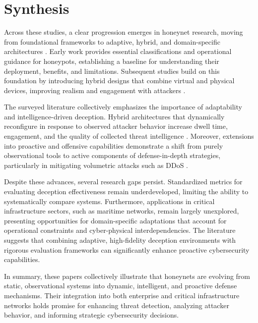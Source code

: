 \documentclass[12pt]{article}
\begin{document}
\section{Synthesis}
Across these studies, a clear progression emerges in honeynet research, moving from foundational frameworks to adaptive, hybrid, and domain-specific architectures \cite{mokube2007honeypots}. Early work provides essential classifications and operational guidance for honeypots, establishing a baseline for understanding their deployment, benefits, and limitations. Subsequent studies build on this foundation by introducing hybrid designs \cite{minjiao2022dynamic} that combine virtual and physical devices, improving realism and engagement with attackers \cite{javadpour2024survey}.

The surveyed literature collectively emphasizes the importance of adaptability and intelligence-driven deception. Hybrid architectures that dynamically reconfigure in response to observed attacker behavior increase dwell time, engagement, and the quality of collected threat intelligence \cite{evan2025implementation}. Moreover, extensions into proactive and offensive capabilities demonstrate a shift from purely observational tools to active components of defense-in-depth strategies, particularly in mitigating volumetric attacks such as DDoS \cite{patil2025ddos}. 

Despite these advances, several research gaps persist. Standardized metrics for evaluating deception effectiveness remain underdeveloped, limiting the ability to systematically compare systems. Furthermore, applications in critical infrastructure sectors, such as maritime networks, remain largely unexplored, presenting opportunities for domain-specific adaptations that account for operational constraints and cyber-physical interdependencies. The literature suggests that combining adaptive, high-fidelity deception environments with rigorous evaluation frameworks can significantly enhance proactive cybersecurity capabilities. 

In summary, these papers collectively illustrate that honeynets are evolving from static, observational systems into dynamic, intelligent, and proactive defense mechanisms. Their integration into both enterprise and critical infrastructure networks holds promise for enhancing threat detection, analyzing attacker behavior, and informing strategic cybersecurity decisions. 

\end{document}
